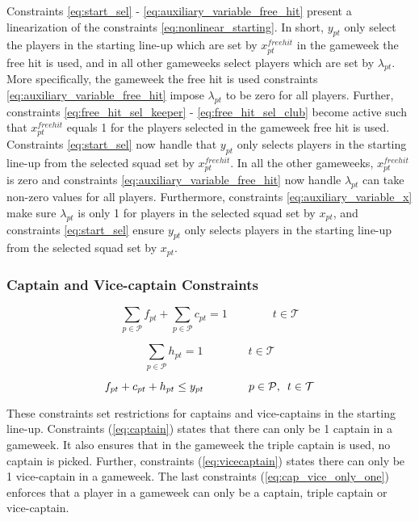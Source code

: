 Constraints \eqref{eq:start_sel} - \eqref{eq:auxiliary_variable_free_hit} present a linearization of the constraints \eqref{eq:nonlinear_starting}. In short, $y_{pt}$ only select the players in the starting line-up which are set by $x_{pt}^{freehit}$ in the gameweek the free hit is used, and in all other gameweeks select players which are set by $\lambda_{pt}$. More specifically, the gameweek the free hit is used constraints
\eqref{eq:auxiliary_variable_free_hit} impose $\lambda_{pt}$ to be zero for all players. Further, constraints \eqref{eq:free_hit_sel_keeper} - \eqref{eq:free_hit_sel_club} become active such that $x_{pt}^{freehit}$ equals 1 for the players selected in the gameweek free hit is used. Constraints \eqref{eq:start_sel} now handle that $y_{pt}$ only selects players in the starting line-up from the selected squad set by $x_{pt}^{freehit}$. In all the other gameweeks, $x_{pt}^{freehit}$ is zero and constraints \eqref{eq:auxiliary_variable_free_hit} now handle $\lambda_{pt}$ can take non-zero values for all players. Furthermore, constraints \eqref{eq:auxiliary_variable_x} make sure $\lambda_{pt}$ is only 1 for players in the selected squad set by $x_{pt}$, and constraints \eqref{eq:start_sel} ensure $y_{pt}$ only selects players in the starting line-up from the selected squad set by $x_{pt}$.

\subsubsection{Captain and Vice-captain Constraints}

\begin{equation} \label{eq:captain}
    \sum_{p \in \mathcal{P}} f_{pt} + \sum_{p \in \mathcal{P}} c_{pt} = 1 \qquad\qquad t \in \mathcal{T}
\end{equation}

\begin{equation} \label{eq:vicecaptain}
    \sum_{p \in \mathcal{P}} h_{pt} = 1 \qquad\qquad t \in \mathcal{T}
\end{equation}

\begin{equation} \label{eq:cap_vice_only_one}
   f_{pt} + c_{pt} + h_{pt} \leq y_{pt}  \qquad\qquad p \in \mathcal{P}, \enskip t \in \mathcal{T}
\end{equation}

These constraints set restrictions for captains and vice-captains in the starting line-up. Constraints (\ref{eq:captain}) states that there can only be 1 captain in a gameweek. It also ensures that in the gameweek the triple captain is used, no captain is picked. Further, constraints (\ref{eq:vicecaptain}) states there can only be 1 vice-captain in a gameweek. The last constraints (\ref{eq:cap_vice_only_one}) enforces that a player in a gameweek can only be a captain, triple captain or vice-captain. 

